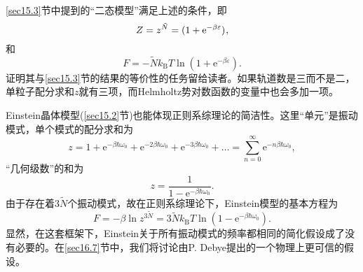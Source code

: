 \ref{sec15.3}节中提到的“二态模型”满足上述的条件，即
\begin{equation}
Z = z^{\tilde N}= (1+\mathrm e^{-\beta\varepsilon})^{\title N},
\end{equation}
和
\begin{equation}
F = -\tilde Nk_\text{B}T\ln(1+\mathrm e^{-\beta\varepsilon}).
\end{equation}
证明其与\ref{sec15.3}节的结果的等价性的任务留给读者。如果轨道数是三而不是二，单粒子配分求和$z$就有三项，而Helmholtz势对数函数的变量中也会多加一项。

Einstein晶体模型(\ref{sec15.2}节)也能体现正则系综理论的简洁性。这里“单元”是振动模式，单个模式的配分求和为
\begin{equation}
z = 1 + \mathrm e^{-\beta\hbar\omega_0} + \mathrm e^{-2\beta\hbar\omega_0} + \mathrm e^{-3\beta\hbar\omega_0} + \dots = \sum\limits_{n=0}^{\infty} \mathrm e^{-n\beta\hbar\omega_0},
\end{equation}
“几何级数”的和为
\begin{equation}
z = \frac{1}{1-\mathrm e^{-\beta\hbar\omega_0}}.
\end{equation}
由于存在着$3\tilde N$个振动模式，故在正则系综理论下，Einstein模型的基本方程为
\begin{equation}
F = -\beta\ln z^{3\tilde N}=3\tilde Nk_\text{B}T\ln(1-\mathrm e^{-\beta\hbar\omega_0}).
\label{equ16.24}
\end{equation}
显然，在这套框架下，Einstein关于所有振动模式的频率都相同的简化假设成了没有必要的。在\ref{sec16.7}节中，我们将讨论由P. Debye提出的一个物理上更可信的假设。

